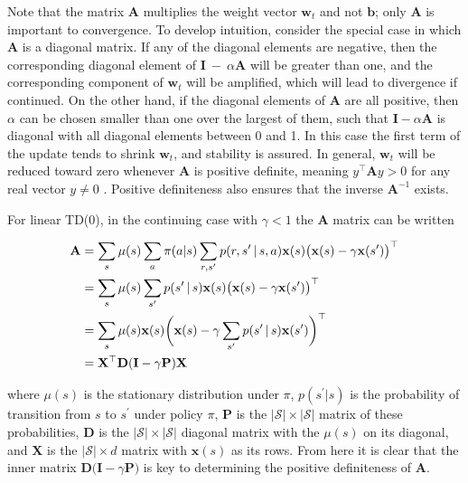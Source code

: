 \documentclass{article}
\begin{document}
Note that the matrix $\mathbf{A}$ multiplies the weight vector $\mathbf { w } _ { t }$ and not $\mathbf{b}$; only $\mathbf{A}$ is important to convergence. To develop intuition, consider the special case 
in which $\mathbf{A}$ is a diagonal matrix. If any of the diagonal elements are negative, then the corresponding diagonal element of $\mathbf { I } \mathrm { ~ - ~ } \alpha \mathbf { A }$ will be greater than one, 
and the corresponding component of $\mathbf { w } _ { t }$ will be amplified, which will lead to divergence if continued. On the other hand, if the diagonal elements of $\mathbf{A}$ are all positive, 
then $\alpha$ can be chosen smaller than one over the largest of them, such that $\mathbf { I } - \alpha \mathbf { A }$ is diagonal with all diagonal elements between 0 and 1. In this case the first term of the update 
tends to shrink $\mathbf { w } _ { t }$, and stability is assured. In general, $\mathbf { w } _ { t }$ will be reduced toward zero whenever $\mathbf{A}$ is positive definite, meaning $y ^ { \top } \mathbf { A } y > 0$ 
for any real vector $y \neq 0$ . Positive definiteness also ensures that the inverse $\mathbf { A } ^ { - 1 }$ exists.

For linear TD(0), in the continuing case with $\gamma < 1$ the $\mathbf{A}$ matrix can be written

$$
\begin{aligned} { \mathbf { A } } & { { } = \sum _ { s } \mu ( s ) \sum _ { a } \pi ( a | s ) \sum _ { r , s ^ { \prime } } p ( r , s ^ { \prime } \thinspace \vert \thinspace s , a ) \mathbf { x } ( s ) \big ( \mathbf { x } ( s ) - \gamma \mathbf { x } ( s ^ { \prime } ) \big ) ^ { \top } } \\ { } & { { } = \sum _ { s } \mu ( s ) \sum _ { s ^ { \prime } } p ( s ^ { \prime } \thinspace \vert \thinspace s ) \mathbf { x } ( s ) \big ( \mathbf { x } ( s ) - \gamma \mathbf { x } ( s ^ { \prime } ) \big ) ^ { \top } } \\ { } & { { } = \sum _ { s } \mu ( s ) \mathbf { x } ( s ) \bigg ( \mathbf { x } ( s ) - \gamma \sum _ { s ^ { \prime } } p ( s ^ { \prime } \thinspace \vert \thinspace s ) \mathbf { x } ( s ^ { \prime } ) \bigg ) ^ { \top } } \\ { } & { { } = \mathbf { X } ^ { \top } \mathbf { D } ( \mathbf { I } - \gamma \mathbf { P } ) \mathbf { X } } \\ \end{aligned}
$$

where $\mu ( s )$ is the stationary distribution under $\pi$, $p ( s ^ { \prime } | s )$ is the probability of transition from $s$ to $s ^ { \prime }$ under policy $\pi$, $\mathbf{P}$ is the $| \mathcal { S } | \times | \mathcal { S } |$ 
matrix of these probabilities, $\mathbf{D}$ is the $| \mathcal { S } | \times | \mathcal { S } |$ diagonal matrix with the $\mu ( s )$ on its diagonal, and $\mathbf{X}$ is the $| \mathcal { S } | \times d$ matrix with $\mathbf { x } ( s )$ as its rows. 
From here it is clear that the inner matrix $\mathbf { D } \big ( \mathbf { I } - \gamma \mathbf { P } \big )$ is key to determining the positive definiteness of $\mathbf{A}$.
\end{document}
